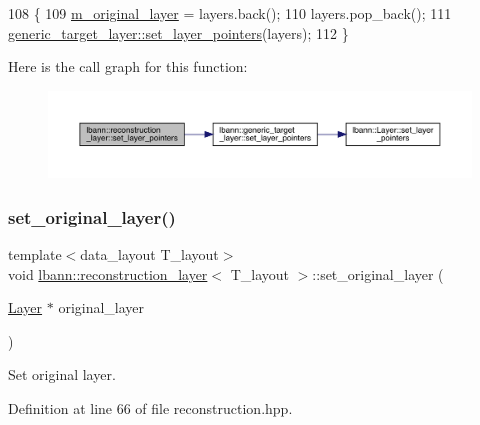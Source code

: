 \begin{DoxyCode}
108                                                              \{
109     \hyperlink{classlbann_1_1reconstruction__layer_a077a29792de2a39015da8b18120a00e3}{m\_original\_layer} = layers.back();
110     layers.pop\_back();
111     \hyperlink{classlbann_1_1generic__target__layer_a1f8f722fadb1223b063c0917afd83b66}{generic\_target\_layer::set\_layer\_pointers}(layers);
112   \}
\end{DoxyCode}
Here is the call graph for this function\+:\nopagebreak
\begin{figure}[H]
\begin{center}
\leavevmode
\includegraphics[width=350pt]{classlbann_1_1reconstruction__layer_a663b2810780ee2b0817f611a00b0b07f_cgraph}
\end{center}
\end{figure}
\mbox{\label{classlbann_1_1reconstruction__layer_a57e3d25871c8472c5a8de71537fdedff}} 
\subsubsection{\texorpdfstring{set\+\_\+original\+\_\+layer()}{set\_original\_layer()}}
{\footnotesize\ttfamily template$<$data\+\_\+layout T\+\_\+layout$>$ \\
void \hyperlink{classlbann_1_1reconstruction__layer}{lbann\+::reconstruction\+\_\+layer}$<$ T\+\_\+layout $>$\+::set\+\_\+original\+\_\+layer (\begin{DoxyParamCaption}\item[{\hyperlink{classlbann_1_1Layer}{Layer} $\ast$}]{original\+\_\+layer }\end{DoxyParamCaption})\hspace{0.3cm}{\ttfamily [inline]}}

Set original layer. 

Definition at line 66 of file reconstruction.\+hpp.


